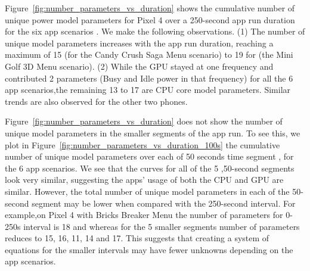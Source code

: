 Figure~\ref{fig:number_parameters_vs_duration} shows 
the cumulative number of unique power model parameters for Pixel 4 over a 250-second app run duration
for the six app scenarios . We make the following observations.
(1) The number of unique model parameters increases with the app run duration, reaching a maximum of 15 (for the Candy Crush Saga Menu scenario) to 19 for (the Mini Golf 3D Menu scenario). 
(2) While the GPU stayed at one frequency and contributed 2 parameters (Busy and Idle power in that frequency) for all the 6 app scenarios,the remaining 13 to 17 are CPU core model parameters.
Similar trends are also observed for the other two  phones.

Figure~\ref{fig:number_parameters_vs_duration} does not show 
the number of unique model parameters in the smaller segments of the app run.
To see this, we plot in Figure~\ref{fig:number_parameters_vs_duration_100s} the 
cumulative number of unique model parameters over  each of 50 seconds time segment , 
for the 6 app scenarios.
We see that the curves for all of the 5 ,50-second segments look very similar, 
suggesting the apps' usage of both the CPU and GPU are similar. 
However, the total number of unique model parameters in each of the 50-second segment
may be lower when compared with the 250-second interval.
For example,on Pixel 4 with Bricks Breaker Menu  the number of parameters
for 0-250s interval is 18 and whereas for the 5 smaller segments number of parameters reduces to 15, 16, 11, 14 and 17.
This suggests that creating a system of equations for the smaller intervals 
may have fewer unknowns depending on the app scenarios.

